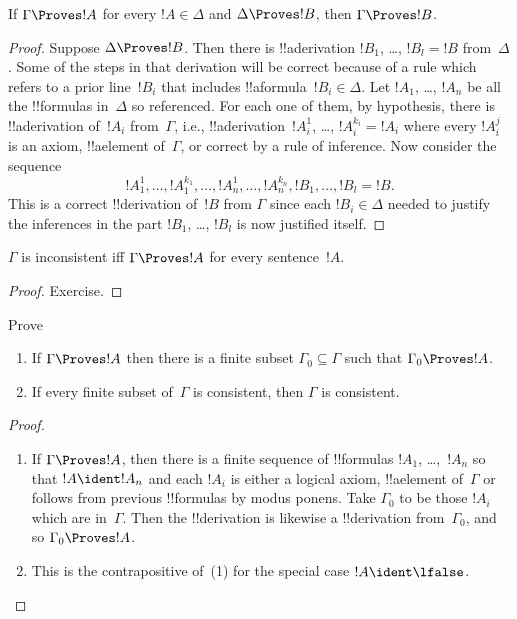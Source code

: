 \documentclass[../../include/open-logic-section]{subfiles}
\begin{document}
\begin{prop}[Transitivity]
If $\Gamma \Proves !A$ for every $!A \in \Delta$ and $\Delta \Proves
!B$, then $\Gamma \Proves !B$.
\end{prop}

\begin{proof}
  Suppose $\Delta \Proves !B$. Then there is !!a{derivation} $!B_1$, \dots, $!B_l = !B$
  from~$\Delta$. Some of the steps in that derivation will be correct
  because of a rule which refers to a prior line~$!B_i$ that includes
  !!a{formula}~$!B_i \in \Delta$. Let $!A_1$, \dots, $!A_n$ be all the
  !!{formula}s in~$\Delta$ so referenced. For each one of them, by
  hypothesis, there is !!a{derivation} of~$!A_i$ from~$\Gamma$, i.e.,
  !!a{derivation}~$!A_i^1$, \dots, $!A_i^{k_i} = !A_i$ where every $!A_i^j$
  is an axiom, !!a{element} of~$\Gamma$, or correct by a rule of
  inference. Now consider the sequence
  \[
  !A_1^1, \dots, !A_1^{k_1}, \dots, !A_n^1, \dots, !A_n^{k_n}, !B_1, \dots, !B_l = !B.
  \]
  This is a correct !!{derivation} of~$!B$ from $\Gamma$ since each
  $!B_i \in \Delta$ needed to justify the inferences in the part
  $!B_1$, \dots, $!B_l$ is now justified itself.
\end{proof}
  
\begin{prop}
$\Gamma$ is inconsistent iff $\Gamma \Proves !A$ for every
  sentence~$!A$.
\end{prop}

\begin{proof}
Exercise.
\end{proof}

\begin{prob}
Prove 
\end{prob}

\begin{prop}[Compactness]
  \begin{enumerate}
  \item If $\Gamma \Proves !A$ then there is a finite subset $\Gamma_0
    \subseteq \Gamma$ such that $\Gamma_0 \Proves !A$.
  \item If every finite subset of~$\Gamma$ is
    consistent, then $\Gamma$ is consistent.
  \end{enumerate}
\end{prop}

\begin{proof}
  \begin{enumerate}
    \item If $\Gamma \Proves !A$, then there is a finite sequence of
      !!{formula}s $!A_1$, \dots,~$!A_n$ so that $!A \ident !A_n$ and
      each $!A_i$ is either a logical axiom, !!a{element} of~$\Gamma$
      or follows from previous !!{formula}s by modus ponens.  Take
      $\Gamma_0$ to be those $!A_i$ which are in~$\Gamma$.  Then the
      !!{derivation} is likewise a !!{derivation} from~$\Gamma_0$, and
      so $\Gamma_0 \Proves !A$.
    \item This is the contrapositive of~(1) for the special case $!A
      \ident \lfalse$.
\end{enumerate}
\end{proof}
\end{document}
